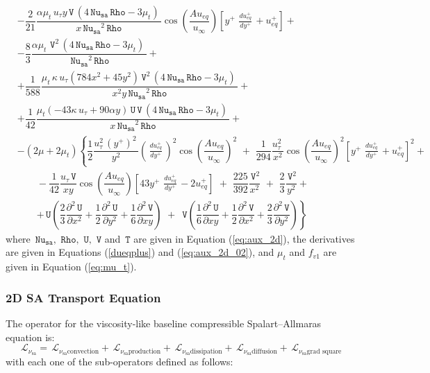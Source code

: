 \documentclass[10pt]{article}
\newcommand{\diff}[2] {\dfrac{\partial #1}{\partial #2}}
\newcommand{\Rho}{\,\mathtt{Rho}}
\newcommand{\U}{\,\mathtt{U}}
\newcommand{\V}{\,\mathtt{V}}
\newcommand{\Nu}{\,\mathtt{Nu_{sa}}}
\newcommand{\T}{\,\mathtt{T}}
\newcommand{\Lo}{\,\mathcal{L}}
\newcommand{\Dueqplusyplus}{\, \frac{du_{eq}^+}{dy^+}\,}
\newcommand{\sa}{\nu_{\mathrm{sa}}}
\begin{document}
\begin{equation*}
\begin{split}
  &-\dfrac{2}{21} \dfrac{ \alpha \mu_t \, u_{\tau} y \V \, (4 \Nu \Rho-3 \mu_t) \,}{x \Nu^2 \Rho} \cos\left(\dfrac{A u_{eq}}{u_{\infty}}\right)\left[y^{+} \, \Dueqplusyplus+u_{eq}^{+} \right]+\\
  &-\dfrac{8}{3} \dfrac{ \alpha \mu_t \, \V^2\, (4 \Nu \Rho-3 \mu_t) \,}{\Nu^2 \Rho}+\\
  &+\dfrac{1}{588} \dfrac{  \mu_t \, \kappa \,  u_{\tau}  (784 x^2+45 y^2)\V^2\, (4 \Nu \Rho-3 \mu_t) \,}{x^2 y \Nu^2 \Rho}+\\
  &+\dfrac{1}{42}  \dfrac{ \mu_t(-43 \kappa \,  u_{\tau}+90 \alpha y) \U \V  \, (4 \Nu \Rho-3 \mu_t) \,}{x \Nu^2 \Rho}+\\
%
&- (2 \mu+2 \mu_t) \left\{\dfrac{1}{2}  \dfrac{u_{\tau}^2 \, (y^{+})^2 \,  }{y^2} \left(\Dueqplusyplus\right)^2 \cos\left(\dfrac{A u_{eq}}{u_{\infty}}\right)^2\,\, +\,\,\dfrac{1}{294}\dfrac{u_{\tau}^2 \, }{x^2} \cos\left(\dfrac{A u_{eq}}{u_{\infty}}\right)^2\left[y^{+} \, \Dueqplusyplus+u_{eq}^{+} \right]^2  +\right.\\
  &\qquad-\dfrac{1}{42}\dfrac{ u_{\tau} \V}{x y} \cos\left(\dfrac{A u_{eq}}{u_{\infty}}\right) \left[43 y^{+} \, \Dueqplusyplus-2 u_{eq}^{+}\right]\,\, +\,\,\dfrac{225}{392} \dfrac{\V^2}{x^2}\,\,+\,\, \dfrac{2}{3} \dfrac{\V^2}{y^2} +\\
  &\qquad\left.+ \U \left(\dfrac{2}{3} \diff{^2 \U}{x^2}+\dfrac{1}{2}  \diff{^2 \U}{y^2}+\dfrac{1}{6} \diff{^2 \V}{xy}\right) \,\, + \,\, \V \left(\dfrac{1}{6} \diff{^2 \U}{xy}+\dfrac{1}{2}  \diff{^2 \V}{x^2}+\dfrac{2}{3} \diff{^2 \V}{y^2}\right) \right\}
 \end{split}
\end{equation*}
%
where  $\Nu,\,\Rho,\,\U,\,\V$ and $\T$ are given in Equation (\ref{eq:aux_2d}), the derivatives are given in Equations (\ref{dueqplus}) and (\ref{eq:aux_2d_02}), and $\mu_t$ and $f_{v1}$ are given in  Equation (\ref{eq:mu_t}).



\subsubsection{2D SA Transport Equation}

The operator for the viscosity-like baseline compressible Spalart--Allmaras equation is:
 $$\Lo_{\sa }=\Lo_{\sa \text{convection}} +  \Lo_{\sa \text{production}} +  \Lo_{\sa \text{dissipation}}+  \Lo_{\sa \text{diffusion}}  +  \Lo_{\sa \text{grad square}}$$
with each one of the sub-operators defined as follows:
\end{document}
